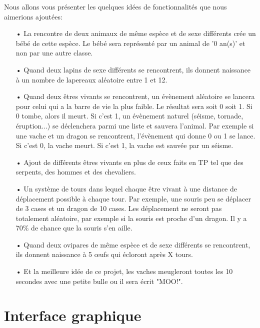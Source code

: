\documentclass[a4paper,12pt]{article} %
\begin{document}
Nous allons vous présenter les quelques idées de fonctionnalités que nous aimerions ajoutées:
\newline
\begin{itemize}
\item[•]La rencontre de deux animaux de même espèce et de sexe différents crée un bébé de cette espèce. Le bébé sera représenté par un animal de '0 an(s)' et non par une autre classe.  
\newline
\item[•]Quand deux lapins de sexe différents se rencontrent, ils donnent naissance à un nombre de lapereaux aléatoire entre 1 et 12.
\newline
\item[•]Quand deux êtres vivants se rencontrent, un évènement aléatoire se lancera pour celui qui a la barre de vie la plus faible. Le résultat sera soit 0 soit 1. Si 0 tombe, alors il meurt. Si c'est 1, un évènement naturel (séisme, tornade, éruption...) se déclenchera parmi une liste et sauvera l'animal. Par exemple si une vache et un dragon se rencontrent, l'évènement qui donne 0 ou 1 se lance. Si c'est 0, la vache meurt. Si c'est 1, la vache est sauvée par un séisme.
\newline
\item[•]Ajout de différents êtres vivants en plus de ceux faits en TP tel que des serpents, des hommes et des chevaliers.
\newline
\item[•]Un système de tours dans lequel chaque être vivant à une distance de déplacement possible à chaque tour. Par exemple, une souris peu se déplacer de 3 cases et un dragon de 10 cases. Les déplacement ne seront pas totalement aléatoire, par exemple si la souris est proche d'un dragon. Il y a 70\% de chance que la souris s'en aille.
\newline
\item[•]Quand deux ovipares de même espèce et de sexe différents se rencontrent, ils donnent naissance à 5 œufs qui écloront après X tours. 
\newline
\item[•]Et la meilleure idée de ce projet, les vaches meugleront toutes les 10 secondes avec une petite bulle ou il sera écrit "MOO!".

\end{itemize}

\section{Interface graphique}
\end{document}
